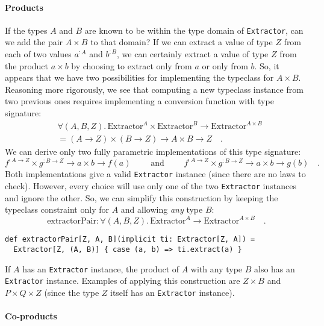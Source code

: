 \paragraph{Products}

If the types $A$ and $B$ are known to be within the type domain
of \lstinline!Extractor!, can we add the pair $A\times B$ to that
domain? If we can extract a value of type $Z$ from each of two values
$a^{:A}$ and $b^{:B}$, we can certainly extract a value of type
$Z$ from the product $a\times b$ by choosing to extract only from
$a$ or only from $b$. So, it appears that we have two possibilities
for implementing the typeclass for $A\times B$. Reasoning more rigorously,
we see that computing a new typeclass instance from two previous ones
requires implementing a conversion function with type signature:
\begin{align*}
 & \forall(A,B,Z).\,\text{Extractor}^{A}\times\text{Extractor}^{B}\rightarrow\text{Extractor}^{A\times B}\\
 & =\left(A\rightarrow Z\right)\times\left(B\rightarrow Z\right)\rightarrow A\times B\rightarrow Z\quad.
\end{align*}
We can derive only two fully parametric implementations of this type
signature: 
\[
f^{:A\rightarrow Z}\times g^{:B\rightarrow Z}\rightarrow a\times b\rightarrow f(a)\quad\quad\text{ and }\quad\quad f^{:A\rightarrow Z}\times g^{:B\rightarrow Z}\rightarrow a\times b\rightarrow g(b)\quad.
\]
Both implementations give a valid \lstinline!Extractor! instance
(since there are no laws to check). However, every choice will use
only one of the two \lstinline!Extractor! instances and ignore the
other. So, we can simplify this construction by keeping the typeclass
constraint only for $A$ and allowing \emph{any} type $B$:
\[
\text{extractorPair}:\forall(A,B,Z).\,\text{Extractor}^{A}\rightarrow\text{Extractor}^{A\times B}\quad.
\]
\begin{lstlisting}
def extractorPair[Z, A, B](implicit ti: Extractor[Z, A]) =
  Extractor[Z, (A, B)] { case (a, b) => ti.extract(a) }
\end{lstlisting}
If $A$ has an \lstinline!Extractor! instance, the product of $A$
with any type $B$ also has an \lstinline!Extractor! instance. Examples
of applying this construction are $Z\times B$ and $P\times Q\times Z$
(since the type $Z$ itself has an \lstinline!Extractor! instance).

\paragraph{Co-products}

